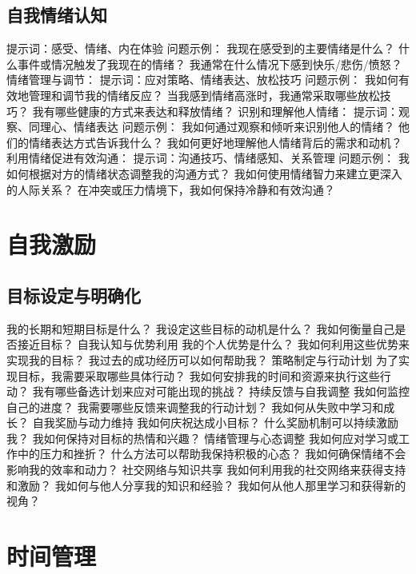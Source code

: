 \documentclass[12pt]{book}
\begin{document}
\subsection{自我情绪认知}
提示词：感受、情绪、内在体验
问题示例：
我现在感受到的主要情绪是什么？
什么事件或情况触发了我现在的情绪？
我通常在什么情况下感到快乐/悲伤/愤怒？
情绪管理与调节：
提示词：应对策略、情绪表达、放松技巧
问题示例：
我如何有效地管理和调节我的情绪反应？
当我感到情绪高涨时，我通常采取哪些放松技巧？
我有哪些健康的方式来表达和释放情绪？
识别和理解他人情绪：
提示词：观察、同理心、情绪表达
问题示例：
我如何通过观察和倾听来识别他人的情绪？
他们的情绪表达方式告诉我什么？
我如何更好地理解他人情绪背后的需求和动机？
利用情绪促进有效沟通：
提示词：沟通技巧、情绪感知、关系管理
问题示例：
我如何根据对方的情绪状态调整我的沟通方式？
我如何使用情绪智力来建立更深入的人际关系？
在冲突或压力情境下，我如何保持冷静和有效沟通？



\section{自我激励}
\subsection{目标设定与明确化}
我的长期和短期目标是什么？
我设定这些目标的动机是什么？
我如何衡量自己是否接近目标？
自我认知与优势利用
我的个人优势是什么？
我如何利用这些优势来实现我的目标？
我过去的成功经历可以如何帮助我？
策略制定与行动计划
为了实现目标，我需要采取哪些具体行动？
我如何安排我的时间和资源来执行这些行动？
我有哪些备选计划来应对可能出现的挑战？
持续反馈与自我调整
我如何监控自己的进度？
我需要哪些反馈来调整我的行动计划？
我如何从失败中学习和成长？
自我奖励与动力维持
我如何庆祝达成小目标？
什么奖励机制可以持续激励我？
我如何保持对目标的热情和兴趣？
情绪管理与心态调整
我如何应对学习或工作中的压力和挫折？
什么方法可以帮助我保持积极的心态？
我如何确保情绪不会影响我的效率和动力？
社交网络与知识共享
我如何利用我的社交网络来获得支持和激励？
我如何与他人分享我的知识和经验？
我如何从他人那里学习和获得新的视角？


\section{时间管理}
\end{document}
